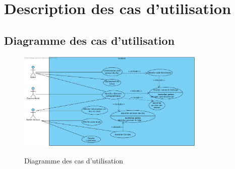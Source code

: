\chapter{Description des cas d'utilisation}
\label{s:Description_Utilisation}

\section{Diagramme des cas d'utilisation}
\label{s:Diagramme_Cas_Utilisation}

\begin{figure}[htp]
\centering
	\includegraphics[width = 0.8\textwidth]{fig/casutilisation.png}
	\label{fig:Cas_Utilisation}
	\caption{Diagramme des cas d'utilisation}
\end{figure}


\pagebreak


